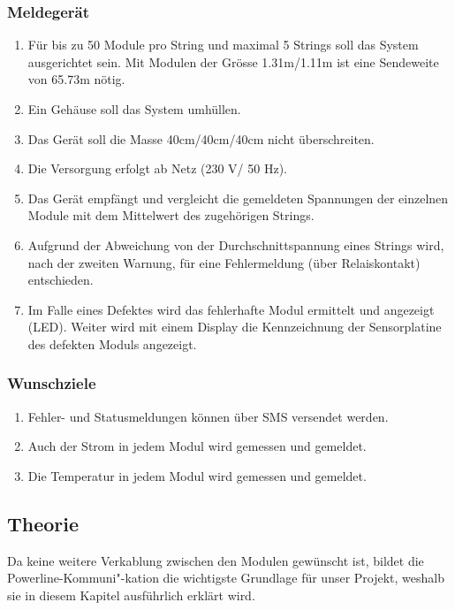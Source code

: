 \subsubsection{Meldegerät}
\begin{enumerate}
\item	Für bis zu 50 Module pro String und maximal 5 Strings soll das System ausgerichtet sein. Mit Modulen der Grösse 1.31m/1.11m ist eine Sendeweite von 65.73m nötig.
\item	Ein Gehäuse soll das  System umhüllen.
\item Das Gerät soll die Masse 40cm/40cm/40cm nicht überschreiten.
\item	Die Versorgung erfolgt ab Netz (230 V/ 50 Hz).
\item	Das Gerät empfängt und vergleicht die gemeldeten Spannungen der einzelnen Module mit dem Mittelwert des zugehörigen Strings.
\item	Aufgrund der Abweichung von der Durchschnittspannung eines Strings wird, nach der zweiten Warnung, für eine Fehlermeldung (über Relaiskontakt) entschieden.
\item	Im Falle eines Defektes wird das fehlerhafte Modul ermittelt und angezeigt (LED). Weiter wird mit einem Display die Kennzeichnung der Sensorplatine des defekten Moduls angezeigt.
\end{enumerate}

\subsubsection{Wunschziele}
\begin{enumerate}
\item	Fehler- und Statusmeldungen können über SMS versendet werden.
\item	Auch der Strom in jedem Modul wird gemessen und gemeldet.
\item	Die Temperatur in jedem Modul wird gemessen und gemeldet.
\end{enumerate}
\subsection{Theorie}
Da keine weitere Verkablung zwischen den Modulen gewünscht ist, bildet die Powerline-Kommuni"-kation die wichtigste Grundlage für unser Projekt, weshalb sie in diesem Kapitel ausführlich erklärt wird. 
